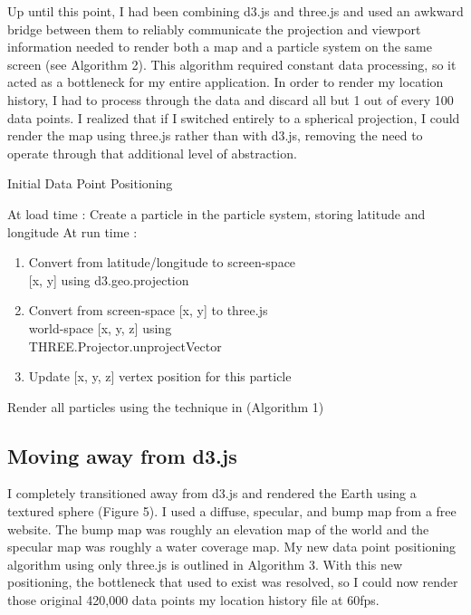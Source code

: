 \documentclass[conference]{acmsiggraph}
\begin{document}
Up until this point, I had been combining d3.js and three.js and used an awkward
bridge between them to reliably communicate the projection and viewport
information needed to render both a map and a particle system on the same
screen (see Algorithm 2). This algorithm required constant data processing, so
it acted as a bottleneck for my entire application. In order to render my
location history, I had to process through the data and discard all but 1 out of
every 100 data points. I realized that if I switched entirely to a spherical
projection, I could render the map using three.js rather than with d3.js,
removing the need to operate through that additional level of abstraction.

\begin{algorithm}
\DontPrintSemicolon
\caption{Initial Data Point Positioning}
    At load time :  {
        Create a particle in the particle system, storing latitude and longitude
    }
    At run time :  {
         {
            \begin{enumerate}
                \item Convert from latitude/longitude to screen-space \\
                    {[}x, y{]} using d3.geo.projection
                \item Convert from screen-space {[}x, y{]} to three.js \\
                    world-space {[}x, y, z{]} using \\
                    THREE.Projector.unprojectVector
                \item Update {[}x, y, z{]} vertex position for this particle
            \end{enumerate}
        }
        Render all particles using the technique in (Algorithm 1)
    }
\end{algorithm}

\subsection{Moving away from d3.js}

I completely transitioned away from d3.js and rendered the Earth using a
textured sphere (Figure 5). I used a diffuse, specular, and bump map from a free
website. The bump map was roughly an elevation map of the world and the specular
map was roughly a water coverage map. My new data point positioning algorithm
using only three.js is outlined in Algorithm 3. With this new positioning,
the bottleneck that used to exist was resolved, so I could now render those
original 420,000 data points my location history file at 60fps.
\end{document}
